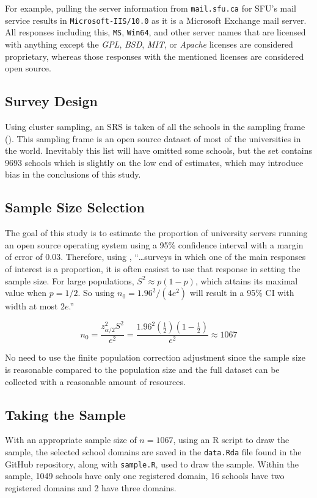 \documentclass{article}
\theoremstyle{definition}
\begin{document}
\begin{flushleft}
\begin{multicols}{2}
For example, pulling the server information from \texttt{mail.sfu.ca} for
SFU's mail service results in \texttt{Microsoft-IIS/10.0} as it is a
Microsoft Exchange mail server. All responses including this, \texttt{MS},
\texttt{Win64}, and other server names that are licensed with anything
except the \textit{GPL}, \textit{BSD}, \textit{MIT}, or \textit{Apache}
licenses are considered proprietary, whereas those responses with
the mentioned licenses are considered open source.

\subsection{Survey Design}

Using cluster
sampling, an SRS is taken of all the schools in the sampling
frame (\cite{Hipo}). This sampling frame is an open source dataset
of most of the universities in the world. Inevitably
this list will have omitted some schools, but the set
contains 9693 schools which is slightly on the low
end of estimates, which may introduce bias in the
conclusions of this study.

\subsection{Sample Size Selection}
The goal of this study is
to estimate the proportion of university servers
running an open source operating system using a 95\% confidence
interval with a margin of error of 0.03.
Therefore, using
\cite{lohr2019},
``\dots surveys in which one of the main responses of interest
is a proportion, it is often easiest to use that response
in setting the sample size.
For large populations, $S^2 \approx p(1-p)$, which
attains its maximal value when $p=1/2$. So using
$n_0=1.96^2/(4e^2)$ will result in a 95\% CI with width at most
$2e$.''

$$
	n_0
	=
	\frac{
		z^2_{\alpha/2}S^2
	}{
		e^2
	}
	=
	\frac{
		1.96^2(\frac{1}{2})(1-\frac{1}{2})
	}{
		e^2
	}
	\approx
	1067
$$

No need to use the finite population correction adjustment
since the sample size
is reasonable compared to the population size and the full
dataset can be collected with a reasonable amount of resources.

\subsection{Taking the Sample}
With an appropriate sample size of $n=1067$,
using an R script to
draw the sample, the selected school domains
are saved in the \texttt{data.Rda} file found
in the GitHub repository, along with \texttt{sample.R},
used to draw the sample.
Within the sample, 1049 schools have only
one registered domain, 16 schools have two
registered domains and 2 have three
domains.


\end{multicols}
\end{flushleft}
\end{document}
